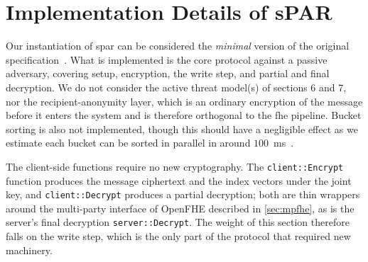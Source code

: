 \section{Implementation Details of sPAR}
\label{sec:impl:spar}
Our instantiation of \gls{spar} can be considered the \emph{minimal} version of the original specification~\cite{cryptoeprint:2025/860}. What is implemented is the core protocol against a passive adversary, covering setup, encryption, the write step, and partial and final decryption. We do not consider the active threat model(s) of sections 6 and 7, nor the recipient-anonymity layer, which is an ordinary encryption of the message before it enters the system and is therefore orthogonal to the \gls{fhe} pipeline. Bucket sorting is also not implemented, though this should have a negligible effect as we estimate each bucket can be sorted in parallel in around $100$~ms~\cite{cryptoeprint:2025/860}. %


The client-side functions require no new cryptography. The \texttt{client::Encrypt} function produces the message ciphertext and the index vectors under the joint key, and \texttt{client::Decrypt} produces a partial decryption; both are thin wrappers around the multi-party interface of OpenFHE described in \autoref{sec:mpfhe}, as is the server's final decryption \texttt{server::Decrypt}. The weight of this section therefore falls on the write step, which is the only part of the protocol that required new machinery.

